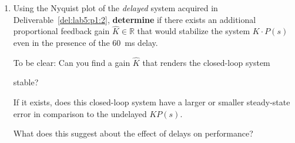 \begin{deliverable}[label={lab5:report}]
\begin{enumerate}[label={(\arabic*)}]
{      In 4G/LTE communication networks the mean round trip time of a packet is around \SI{50}{\milli\second}.

      \textbf{Would} your uncompensated system be stable if the feedback loop involved communication over a similar wireless network with comparable delays?
      If not, would the compensated system be stable?
      \label{lab5:report:q6}
    }
    \item{%
      Using the Nyquist plot of the \emph{delayed} system acquired in Deliverable~\ref{del:lab5:p1:2}, \textbf{determine} if there exists an additional proportional feedback gain \(\hat{K} \in \mathbb{R}\) that would stabilize the system \(K \cdot P(s)\) even in the presence of the \SI{60}{\milli\second} delay.

      To be clear: Can you find a gain \(\hat{K}\) that renders the closed-loop system
      \begin{center}
      \end{center}
      stable?

      If it exists, does this closed-loop system have a larger or smaller steady-state error in comparison to the undelayed \(K P(s).\)

      What does this suggest about the effect of delays on performance?
      \label{lab5:report:q7}
    }
  \end{enumerate}
\end{deliverable}

